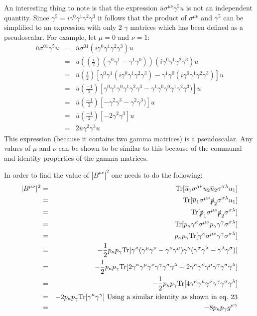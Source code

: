 \documentclass[12pt]{article}
\def \bea{\begin{eqnarray}}
\def \eea{\end{eqnarray}}
\def \Tr{{\rm Tr}}
\def \nn{\nonumber}
\def \nl{\nn \\}
\def \ou{\overline{u}}
\def \ga{\gamma}
\def \ka{\kappa}
\def \la{\lambda}
\def \si{\sigma}
\begin{document}
\begin{enumerate}
An interesting thing to note is that the expression $\ou \si^{\mu\nu} \ga^5 u$ is not an independent quantity. Since $\ga^5 =i\ga^0\ga^1\ga^2\ga^3$ it follows that the product of $\si^{\mu\nu}$ and $\ga^5$ can be simplified to an expression with only 2 $\ga$ matrices which has been defined as a pseudoscalar. For example, let $\mu =0$ and $\nu=1$:
\bea
\ou \si^{01} \ga^5 u &=& \ou \si^{01} (i\ga^0\ga^1\ga^2\ga^3) u \\
&=&  \ou ((\frac{i}{2})(\ga^0\ga^1 -\ga^1\ga^0)) (i\ga^0\ga^1\ga^2\ga^3) u \nl
&=&  \ou (\frac{i}{2})[\ga^0\ga^1(i\ga^0\ga^1\ga^2\ga^3) -\ga^1\ga^0(i\ga^0\ga^1\ga^2\ga^3)] u \nl
&=&  \ou (\frac{-1}{2})[\ga^0\ga^1\ga^0\ga^1\ga^2\ga^3 -\ga^1\ga^0\ga^0\ga^1\ga^2\ga^3)] u \nl
&=& \ou (\frac{-1}{2})[-\ga^2\ga^3 -\ga^2\ga^3)] u\nl
&=& \ou (\frac{-1}{2})[-2\ga^2\ga^3] u\nl
&=& 2\ou \ga^2\ga^3 u
\eea
This expression (because it contains two gamma matrices) is a pseudoscalar. Any values of $\mu$ and $\nu$ can be shown to be similar to this because of the communal and identity properties of the gamma matrices.

In order to find the value of $|B^{\mu\nu}|^2$ one needs to do the following:
\bea
|B^{\mu\nu}|^2 &=& \Tr[\ou_1 \si^{\mu\nu} u_2\ou_2 \si^{\si\la}u_1]\nl
&=& \Tr[\ou_1 \si^{\mu\nu}\slashed{p}_2 \si^{\si\la} u_1]\nl
&=& \Tr[\slashed{p}_1\si^{\mu\nu}\slashed{p}_2 \si^{\si\la}]\nl
&=& \Tr[p_\ka \ga^\ka \si^{\mu\nu}p_\ga \ga^\ga \si^{\si\la}]\nl
&=& p_\ka p_\ga \Tr[\ga^\ka \si^{\mu\nu}\ga^\ga \si^{\si\la}]\nl
&=& -\frac{1}{2} p_\ka p_\ga \Tr[\ga^\ka (\ga^\mu \ga^\nu - \ga^\nu \ga^\mu) \ga^\ga (\ga^\si \ga^\la - \ga^\la \ga^\si)]\nl
&=& -\frac{1}{2} p_\ka p_\ga \Tr[2\ga^\ka \ga^\mu \ga^\nu \ga^\ga \ga^\si \ga^\la  - 2\ga^\ka \ga^\nu \ga^\mu \ga^\ga \ga^\si \ga^\la]\nl
&=& -\frac{1}{2} p_\ka p_\ga \Tr[4\ga^\ka \ga^\mu \ga^\nu \ga^\ga \ga^\si \ga^\la]\nl
&=& -2p_\ka p_\ga \Tr[\ga^\ka \ga^\ga]~{\rm Using~ a~ similar~ identity~ as~ shown~ in~ eq.~ 23}\nl
&=& -8p_\ka p_\ga g^{\ka\ga}
\eea

\end{enumerate}
\end{document}
